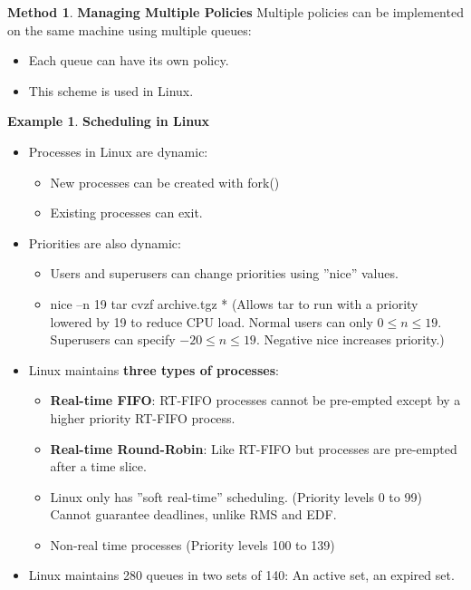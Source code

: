 \documentclass[11pt,a4paper]{article}
\theoremstyle{definition}
\newtheorem{example}{Example}[section]
\newtheorem{method}{Method}[section]
\newenvironment{myitemize}
{ \begin{itemize}
    \setlength{\itemsep}{5pt}
    \setlength{\parskip}{0pt}
    \setlength{\parsep}{0pt}     }
{ \end{itemize}                  }
\begin{document}
\begin{method}{\textbf{Managing Multiple Policies}}
	Multiple policies can be implemented on the same machine using multiple queues:
	\begin{myitemize}
		\item Each queue can have its own policy.
		\item This scheme is used in Linux.
	\end{myitemize}
\end{method}

\begin{example}{\textbf{Scheduling in Linux}}
	\begin{myitemize}
		\item Processes in Linux are dynamic:
		\begin{myitemize}
			\item New processes can be created with \textsf{fork()}
			\item Existing processes can exit.
		\end{myitemize}
		\item Priorities are also dynamic:
		\begin{myitemize}
			\item Users and superusers can change priorities using ''nice'' values.
			\item \textsf{nice –n 19 tar cvzf archive.tgz *} (Allows tar to run with a priority lowered by 19 to reduce CPU load. Normal users can only $0\leq n \leq 19$. Superusers can specify $-20\leq n \leq 19$. Negative nice increases priority.)
		\end{myitemize}
		\item Linux maintains \textbf{three types of processes}:
		\begin{myitemize}
			\item \textbf{Real-time FIFO}: \textsf{RT-FIFO} processes cannot be pre-empted except by a higher priority \textsf{RT-FIFO} process.
			\item \textbf{Real-time Round-Robin}: Like \textsf{RT-FIFO} but processes are pre-empted after a time slice.
			\item Linux only has ''soft real-time'' scheduling. (Priority levels 0 to 99) Cannot guarantee deadlines, unlike \textsf{RMS} and \textsf{EDF}. 
			\item Non-real time processes (Priority levels 100 to 139)
		\end{myitemize}
		\item Linux maintains 280 queues in two sets of 140: An active set, an expired set.

\end{myitemize}
\end{example}
\end{document}
